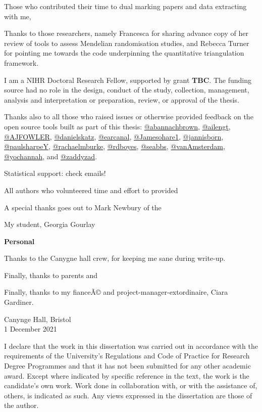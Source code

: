 \documentclass[a4paper, twoside]{templates/ociamthesis}
\begin{document}
\begin{romanpages}
\begin{acknowledgements}
  Those who contributed their time to dual marking papers and data extracting with me,

  Thanks to those researchers, namely Francesca for sharing advance copy of her review of tools to assess Mendelian randomisation studies, and Rebecca Turner for pointing me towards the code underpinning the quantitative triangulation framework.

  I am a NIHR Doctoral Research Fellow, supported by grant \textbf{TBC}. The funding source had no role in the design, conduct of the study, collection, management, analysis and interpretation or preparation, review, or approval of the thesis.

  Thanks also to all those who raised issues or otherwise provided feedback on the open source tools built as part of this thesis:
  \href{https://github.com/abannachbrown}{@abannachbrown}, \href{https://github.com/ailengt}{@ailengt}, \href{https://github.com/AJFOWLER}{@AJFOWLER}, \href{https://github.com/danielskatz}{@danielskatz}, \href{https://github.com/earcanal}{@earcanal}, \href{https://github.com/Jamesohare1}{@Jamesohare1}, \href{https://github.com/jannisborn}{@jannisborn}, \href{https://github.com/paulsharpeY}{@paulsharpeY}, \href{https://github.com/rachaelmburke}{@rachaelmburke}, \href{https://github.com/rdboyes}{@rdboyes}, \href{https://github.com/seabbs}{@seabbs}, \href{https://github.com/vanAmsterdam}{@vanAmsterdam}, \href{https://github.com/yochannah}{@yochannah}, and \href{https://github.com/zaddyzad}{@zaddyzad}.

  Statistical support: check emails!

  All authors who volunteered time and effort to provided

  A special thanks goes out to Mark Newbury of the

  My student, Georgia Gourlay

  \textbf{Personal}

  Thanks to the Canygne hall crew, for keeping me sane during write-up.

  Finally, thanks to parents and

  Finally, thanks to my fianceÃ© and project-manager-extordinaire, Ciara Gardiner.

  \begin{flushright}
  Canynge Hall, Bristol \\1 December 2021
  \end{flushright}
\end{acknowledgements}

\begin{declaration}
 	I declare that the work in this dissertation was carried out in accordance with the requirements of the University's Regulations and Code of Practice for Research Degree Programmes and that it has not been submitted for any other academic award. Except where indicated by specific reference in the text, the work is the candidate's own work. Work done in collaboration with, or with the assistance of, others, is indicated as such. Any views expressed in the dissertation are those of the author.


\end{declaration}
\end{romanpages}
\end{document}
